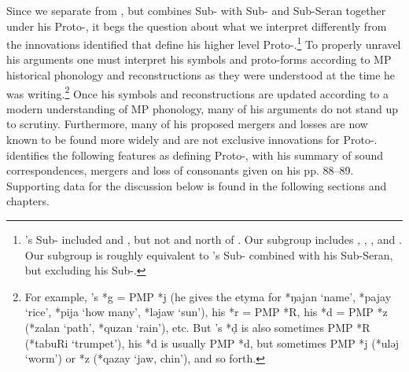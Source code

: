 Since we separate  from ,
but \citeauthor{Stresemann1927} combines Sub- with Sub-
and Sub-Seran together under his Proto-,
it begs the question about what we interpret differently from
the innovations \citeauthor{Stresemann1927} identified that define his higher
level Proto-.\footnote{
		\citeauthor{Stresemann1927}’s Sub- included 
		and , but not 
		and  north of .
		Our  subgroup includes ,
		, ,  and .
		Our  subgroup is roughly equivalent to \citeauthor{Stresemann1927}'s
		Sub- combined with his Sub-Seran,
		but excluding his Sub-.}						
To properly unravel his arguments
one must interpret his symbols
and proto-forms according to MP historical phonology
and reconstructions as they were understood at the time he was
writing.\footnote{
		For example, \citeauthor{Stresemann1927}'s *g{\Q} = PMP *j (he gives the etyma for *ŋajan ‘name’,
		*pajay ‘rice’, *pija ‘how many’, *ləjaw ‘sun’),
		his *r = PMP *R,
		his *d{\Q} = PMP *z (*zalan ‘path’, *quzan ‘rain’), etc.
		But \citeauthor{Stresemann1927}'s *ḍ is also sometimes PMP *R (*tabuRi ‘trumpet’),
		his *d is usually PMP *d,
		but sometimes PMP *j (*uləj ‘worm’) or *z (*qazay ‘jaw,
		chin’), and so forth.}
Once his symbols
and reconstructions are updated according to a modern understanding
of MP phonology, many of his arguments do not stand up to scrutiny.
Furthermore, many of his proposed mergers
and losses are now known to be found more widely
and are not exclusive innovations for Proto-.
\citet[14--102]{Stresemann1927} identifies the following features
as defining Proto-, with his summary of sound correspondences,
mergers and loss of consonants given on his pp. 88--89.
Supporting data for the discussion below is found in the following
sections and chapters.

